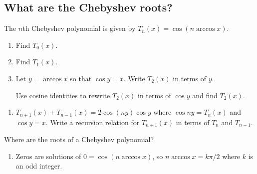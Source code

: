 \documentclass[12pt,letterpaper,noanswers]{exam}
\begin{document}
\subsection*{What are the Chebyshev roots?}
The $n$th Chebyshev polynomial is given by $T_n(x) = \cos(n\arccos x)$.

\begin{enumerate}[resume]
\itemsep60pt
\item Find $T_0(x)$.
\item Find $T_1(x)$.
\item Let $y = \arccos x$ so that $\cos y = x$.  Write $T_2(x)$ in terms of $y$.

Use cosine identities to rewrite $T_2(x)$ in terms of $\cos y$ and find $T_2(x)$.
\end{enumerate}

\vspace{1in}

\begin{enumerate}[resume]
\item $T_{n+1}(x) + T_{n-1}(x) = 2\cos(ny)\cos y$ where $\cos ny = T_n(x)$ and $\cos y = x$.  Write a recursion relation for $T_{n+1}(x)$ in terms of $T_n$ and $T_{n-1}$.
\end{enumerate}
\vspace{1in}

Where are the roots of a Chebyshev polynomial?
\begin{enumerate}[resume]
\item Zeros are solutions of $0 = \cos(n\arccos x)$, so $n\arccos x = k\pi/2$ where $k$ is an odd integer.  
\end{enumerate}

\vspace{1in}
\end{document}
